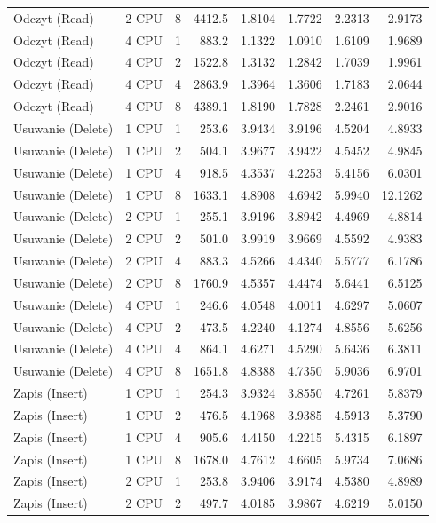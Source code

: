 \begin{table}[ht]
{\begin{tabular}{llcrrrrr}
Odczyt (Read) & 2 CPU & 8 & 4412.5 & 1.8104 & 1.7722 & 2.2313 & 2.9173 \\
Odczyt (Read) & 4 CPU & 1 & 883.2 & 1.1322 & 1.0910 & 1.6109 & 1.9689 \\
Odczyt (Read) & 4 CPU & 2 & 1522.8 & 1.3132 & 1.2842 & 1.7039 & 1.9961 \\
Odczyt (Read) & 4 CPU & 4 & 2863.9 & 1.3964 & 1.3606 & 1.7183 & 2.0644 \\
Odczyt (Read) & 4 CPU & 8 & 4389.1 & 1.8190 & 1.7828 & 2.2461 & 2.9016 \\
Usuwanie (Delete) & 1 CPU & 1 & 253.6 & 3.9434 & 3.9196 & 4.5204 & 4.8933 \\
Usuwanie (Delete) & 1 CPU & 2 & 504.1 & 3.9677 & 3.9422 & 4.5452 & 4.9845 \\
Usuwanie (Delete) & 1 CPU & 4 & 918.5 & 4.3537 & 4.2253 & 5.4156 & 6.0301 \\
Usuwanie (Delete) & 1 CPU & 8 & 1633.1 & 4.8908 & 4.6942 & 5.9940 & 12.1262 \\
Usuwanie (Delete) & 2 CPU & 1 & 255.1 & 3.9196 & 3.8942 & 4.4969 & 4.8814 \\
Usuwanie (Delete) & 2 CPU & 2 & 501.0 & 3.9919 & 3.9669 & 4.5592 & 4.9383 \\
Usuwanie (Delete) & 2 CPU & 4 & 883.3 & 4.5266 & 4.4340 & 5.5777 & 6.1786 \\
Usuwanie (Delete) & 2 CPU & 8 & 1760.9 & 4.5357 & 4.4474 & 5.6441 & 6.5125 \\
Usuwanie (Delete) & 4 CPU & 1 & 246.6 & 4.0548 & 4.0011 & 4.6297 & 5.0607 \\
Usuwanie (Delete) & 4 CPU & 2 & 473.5 & 4.2240 & 4.1274 & 4.8556 & 5.6256 \\
Usuwanie (Delete) & 4 CPU & 4 & 864.1 & 4.6271 & 4.5290 & 5.6436 & 6.3811 \\
Usuwanie (Delete) & 4 CPU & 8 & 1651.8 & 4.8388 & 4.7350 & 5.9036 & 6.9701 \\
Zapis (Insert) & 1 CPU & 1 & 254.3 & 3.9324 & 3.8550 & 4.7261 & 5.8379 \\
Zapis (Insert) & 1 CPU & 2 & 476.5 & 4.1968 & 3.9385 & 4.5913 & 5.3790 \\
Zapis (Insert) & 1 CPU & 4 & 905.6 & 4.4150 & 4.2215 & 5.4315 & 6.1897 \\
Zapis (Insert) & 1 CPU & 8 & 1678.0 & 4.7612 & 4.6605 & 5.9734 & 7.0686 \\
Zapis (Insert) & 2 CPU & 1 & 253.8 & 3.9406 & 3.9174 & 4.5380 & 4.8989 \\
Zapis (Insert) & 2 CPU & 2 & 497.7 & 4.0185 & 3.9867 & 4.6219 & 5.0150 \\

\end{tabular}}
\end{table}
